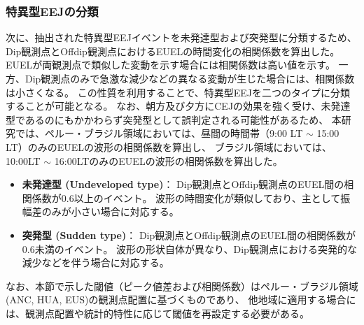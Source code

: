 \subsubsection{特異型EEJの分類}
次に、抽出された特異型EEJイベントを未発達型および突発型に分類するため、
Dip観測点とOffdip観測点におけるEUELの時間変化の相関係数を算出した。
EUELが両観測点で類似した変動を示す場合には相関係数は高い値を示す。
一方、Dip観測点のみで急激な減少などの異なる変動が生じた場合には、相関係数は小さくなる。
この性質を利用することで、特異型EEJを二つのタイプに分類することが可能となる。
なお、朝方及び夕方にCEJの効果を強く受け、未発達型であるのにもかかわらず突発型として誤判定される可能性があるため、
本研究では、ペルー・ブラジル領域においては、昼間の時間帯（9:00 LT $\sim$ 15:00 LT）のみのEUELの波形の相関係数を算出し、
ブラジル領域においては、10:00LT $\sim$ 16:00LTのみのEUELの波形の相関係数を算出した。


\begin{itemize}
    \item \textbf{未発達型 (Undeveloped type)}：
    Dip観測点とOffdip観測点のEUEL間の相関係数が0.6以上のイベント。
    波形の時間変化が類似しており、主として振幅差のみが小さい場合に対応する。
    \item \textbf{突発型 (Sudden type)}：
    Dip観測点とOffdip観測点のEUEL間の相関係数が0.6未満のイベント。
    波形の形状自体が異なり、Dip観測点における突発的な減少などを伴う場合に対応する。
\end{itemize}

なお、本節で示した閾値（ピーク値差および相関係数）はペルー・ブラジル領域(ANC, HUA, EUS)の観測点配置に基づくものであり、
他地域に適用する場合には、観測点配置や統計的特性に応じて閾値を再設定する必要がある。